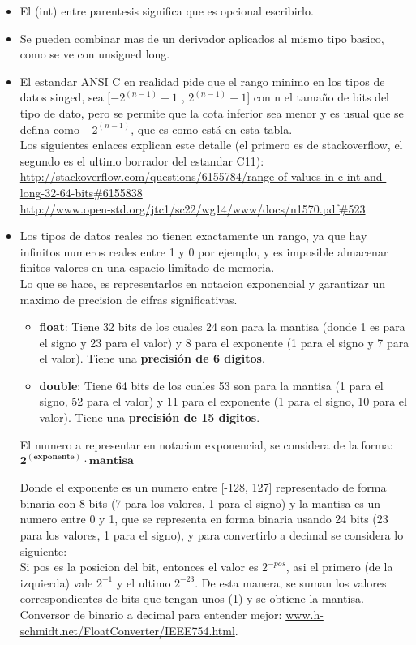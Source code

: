 \documentclass[letterpaper]{report}
\begin{document}
\begin{itemize}
\item El (int) entre parentesis significa que es opcional escribirlo.
\item Se pueden combinar mas de un derivador aplicados al mismo tipo basico, como se ve con unsigned long.
\item El estandar ANSI C en realidad pide que el rango minimo en los tipos de datos singed, sea [$-2^{(n-1)} + 1$ , $2^{(n-1)} - 1$] con n el tamaño de bits del tipo de dato, pero se permite que la cota inferior sea menor y es usual que se defina como $-2^{(n-1)}$, que es como está en esta tabla. \\Los siguientes enlaces explican este detalle (el primero es de stackoverflow, el segundo es el ultimo borrador del estandar C11):\\
\url{http://stackoverflow.com/questions/6155784/range-of-values-in-c-int-and-long-32-64-bits#6155838}\\
\url{http://www.open-std.org/jtc1/sc22/wg14/www/docs/n1570.pdf#523}
\item Los tipos de datos reales no tienen exactamente un rango, ya que hay infinitos numeros reales entre 1 y 0 por ejemplo, y es imposible almacenar finitos valores en una espacio limitado de memoria.\\
Lo que se hace, es representarlos en notacion exponencial y garantizar un maximo de precision de cifras significativas.
\begin{itemize}
  \item \textbf{float}: Tiene 32 bits de los cuales 24 son para la mantisa (donde 1 es para el signo y 23 para el valor) y 8 para el exponente (1 para el signo y 7 para el valor). Tiene una \textbf{precisión de 6 digitos}.
  \item \textbf{double}: Tiene 64 bits de los cuales 53 son para la mantisa (1 para el signo, 52 para el valor) y 11 para el exponente (1 para el signo, 10 para el valor). Tiene una \textbf{precisión de 15 digitos}.
\end{itemize}
El numero a representar en notacion exponencial, se considera de la forma: $\mathbf{ 2^{(exponente)} \cdot mantisa}$\\\\
Donde el exponente es un numero entre [-128, 127] representado de forma binaria con 8 bits (7 para los valores, 1 para el signo) y la mantisa es un numero entre 0 y 1, que se representa en forma binaria usando 24 bits (23 para los valores, 1 para el signo), y para convertirlo a decimal se considera lo siguiente:\\
Si pos es la posicion del bit, entonces el valor es $2^{-pos}$, asi el primero (de la izquierda) vale $2^{-1}$ y el ultimo $2^{-23}$. De esta manera, se suman los valores correspondientes de bits que tengan unos (1) y se obtiene la mantisa. Conversor de binario a decimal para entender mejor: \url{www.h-schmidt.net/FloatConverter/IEEE754.html}.
\end{itemize}
\pagebreak
\end{document}
